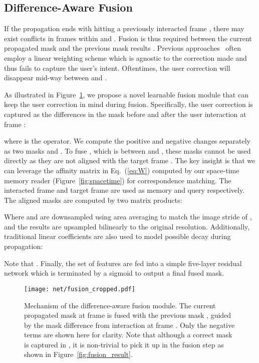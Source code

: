 \documentclass[final]{cvpr}
\begin{document}
	\subsection{Difference-Aware Fusion}\label{fusion}
	If the propagation ends with hitting a previously interacted frame , there may exist conflicts in frames within  and . Fusion is thus required between the current propagated mask  and the previous mask results .
	Previous approaches~\cite{oh2019fastInteractive,Yuk2020IVOSGlobalLocal} often employ a linear weighting scheme which is agnostic to the correction made and thus fails to capture the user's intent. 
	Oftentimes, the user correction will disappear mid-way between   and .
	
	As illustrated in Figure~\ref{fig:fusion}, we propose a novel learnable fusion module that can keep the user correction in mind during fusion. Specifically, the user correction is captured as the differences in the mask before and after the user interaction at frame :
	
	where  is the  operator. We compute the positive and negative changes separately as two masks  and . To fuse , which is between  and , these masks cannot be used directly as they are not aligned with the target frame . 
	The key insight is that we can leverage the affinity matrix  in Eq.~(\ref{eq:W}) computed by our space-time memory reader (Figure~\ref{fig:spacetime}) for correspondence matching. The interacted frame  and target frame  are used as memory and query respectively. 
	The aligned masks are computed by two matrix products:
	
	Where  and  are downsampled using area averaging to match the image stride of , and the results are upsampled bilinearly to the original resolution.
	Additionally, traditional linear coefficients are also used to model possible decay during propagation:
	
	Note that .
	Finally, the set of features  are fed into a simple five-layer residual network which is terminated by a sigmoid to output a final fused mask. 
	
	\begin{figure}[t]
		\begin{center}
			\texttt{[image: net/fusion\_cropped.pdf]}
		\end{center}
		\vspace{-0.15in}
		\caption{
			Mechanism of the difference-aware fusion module. The current propagated mask  at frame  is fused with the previous mask , guided by the mask difference from interaction at frame . Only the negative terms  are shown here for clarity. Note that although a correct mask is captured in , it is non-trivial to pick it up in the fusion step as shown in Figure~\ref{fig:fusion_result}.
		}
		\label{fig:fusion}
		\vspace{-0.15in}
	\end{figure}
	
\end{document}
